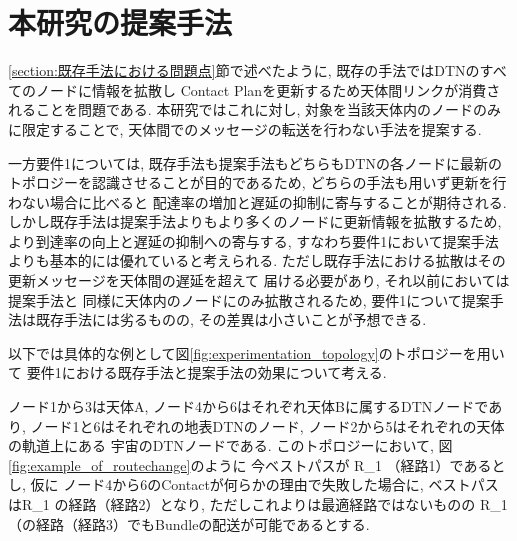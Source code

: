 \section{本研究の提案手法}
\label{section:要件1における既存手法と提案手法の比較}
\ref{section:既存手法における問題点}節で述べたように, 既存の手法ではDTNのすべてのノードに情報を拡散し
Contact Planを更新するため天体間リンクが消費されることを問題である.   
本研究ではこれに対し, 対象を当該天体内のノードのみに限定することで, 天体間でのメッセージの転送を行わない手法を提案する.

一方要件1については, 既存手法も提案手法もどちらもDTNの各ノードに最新の
トポロジーを認識させることが目的であるため,
どちらの手法も用いず更新を行わない場合に比べると
配達率の増加と遅延の抑制に寄与することが期待される.
しかし既存手法は提案手法よりもより多くのノードに更新情報を拡散するため,
より到達率の向上と遅延の抑制への寄与する, 
すなわち要件1において提案手法よりも基本的には優れていると考えられる. 
ただし既存手法における拡散はその更新メッセージを天体間の遅延を超えて
届ける必要があり, それ以前においては提案手法と
同様に天体内のノードにのみ拡散されるため, 
要件1について提案手法は既存手法には劣るものの, その差異は小さいことが予想できる. 

以下では具体的な例として図\ref{fig:experimentation_topology}のトポロジーを用いて
要件1における既存手法と提案手法の効果について考える.


ノード1から3は天体A, ノード4から6はそれぞれ天体Bに属するDTNノードであり, 
ノード1と6はそれぞれの地表DTNのノード, ノード2から5はそれぞれの天体の軌道上にある
宇宙のDTNノードである. 
このトポロジーにおいて, 図\ref{fig:example_of_routechange}のように
今ベストパスが R_{1   }（経路1）であるとし, 仮に
ノード4から6のContactが何らかの理由で失敗した場合に, 
ベストパスはR_{1   }の経路（経路2）となり, 
ただしこれよりは最適経路ではないものの
R_{1    }（の経路（経路3）でもBundleの配送が可能であるとする.

